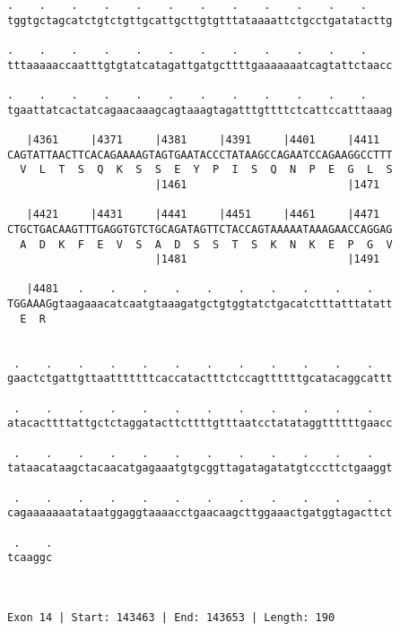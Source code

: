 \documentclass{article}
\begin{document}
\begin{Verbatim}
.    .    .    .    .    .    .    .    .    .    .    .    
tggtgctagcatctgtctgttgcattgcttgtgtttataaaattctgcctgatatacttg
                                                            
.    .    .    .    .    .    .    .    .    .    .    .    
tttaaaaaccaatttgtgtatcatagattgatgcttttgaaaaaaatcagtattctaacc
                                                            
.    .    .    .    .    .    .    .    .    .    .    .    
tgaattatcactatcagaacaaagcagtaaagtagatttgttttctcattccatttaaag
                                                            
   |4361     |4371     |4381     |4391     |4401     |4411  
CAGTATTAACTTCACAGAAAAGTAGTGAATACCCTATAAGCCAGAATCCAGAAGGCCTTT
  V  L  T  S  Q  K  S  S  E  Y  P  I  S  Q  N  P  E  G  L  S
                       |1461                         |1471  
  
   |4421     |4431     |4441     |4451     |4461     |4471  
CTGCTGACAAGTTTGAGGTGTCTGCAGATAGTTCTACCAGTAAAAATAAAGAACCAGGAG
  A  D  K  F  E  V  S  A  D  S  S  T  S  K  N  K  E  P  G  V
                       |1481                         |1491  
  
   |4481   .    .    .    .    .    .    .    .    .    .   
TGGAAAGgtaagaaacatcaatgtaaagatgctgtggtatctgacatctttatttatatt
  E  R                                                      
                                                            
  
 .    .    .    .    .    .    .    .    .    .    .    .   
gaactctgattgttaatttttttcaccatactttctccagttttttgcatacaggcattt
                                                            
 .    .    .    .    .    .    .    .    .    .    .    .   
atacacttttattgctctaggatacttcttttgtttaatcctatataggttttttgaacc
                                                            
 .    .    .    .    .    .    .    .    .    .    .    .   
tataacataagctacaacatgagaaatgtgcggttagatagatatgtcccttctgaaggt
                                                            
 .    .    .    .    .    .    .    .    .    .    .    .   
cagaaaaaaatataatggaggtaaaacctgaacaagcttggaaactgatggtagacttct
                                                            
 .    .
tcaaggc
       
       
 
Exon 14 | Start: 143463 | End: 143653 | Length: 190




\end{Verbatim}
\end{document}
